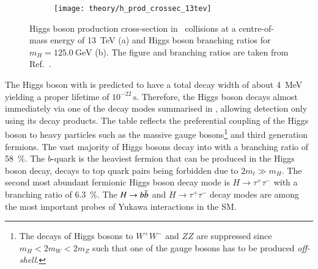 \begin{figure}[htbp]
  \centering

  \begin{subfigure}[b]{0.47\textwidth}
    \centering

    \texttt{[image: theory/h\_prod\_crossec\_13tev]}

    \label{fig:higgs_prod_xsec}
  \end{subfigure}\hfill%
  \begin{subfigure}[b]{0.47\textwidth}
    \centering

    {
      \renewcommand{\arraystretch}{1.1}%
      
    }

    \vspace*{1.5em}

    \label{tab:higgs_branching_ratios}
  \end{subfigure}

  \caption{Higgs boson production cross-section in \pp~collisions at a
    centre-of-mass energy of \SI{13}{\TeV} (a) and Higgs boson branching ratios
    for $m_{H} = \SI{125.0}{\GeV}$ (b). The figure and branching ratios are
    taken from Ref.~\cite{deFlorian:2016spz}.}
\end{figure}

The Higgs boson with is predicted to have a total decay width of about
\SI{4}{\MeV}~\cite{deFlorian:2016spz} yielding a proper lifetime of
$10^{-22}\,\si{\second}$. Therefore, the Higgs boson decays almost immediately
via one of the decay modes summarised in ,
allowing detection only using its decay products. The table reflects the
preferential coupling of the Higgs boson to heavy particles such as the massive
gauge bosons\footnote{The decays of Higgs bosons to $W^+W^-$ and $ZZ$ are
  suppressed since $m_{H} < 2 m_{W} < 2 m_{Z}$ such that one of the gauge bosons
  has to be produced \emph{off-shell}.} and third generation fermions. The vast
majority of Higgs bosons decay into \bbbar with a branching ratio of
\SI{58}{\percent}. The $b$-quark is the heaviest fermion that can be produced in
the Higgs boson decay, decays to top quark pairs being forbidden due to
$2 m_t \gg m_H$. The second most abundant fermionic Higgs boson decay mode is
$H \to \tau^+ \tau^-$ with a branching ratio of \SI{6.3}{\percent}. The
$H \to b\bar{b}$ and $H \to \tau^+ \tau^-$ decay modes are among the most
important probes of Yukawa interactions in the SM.


